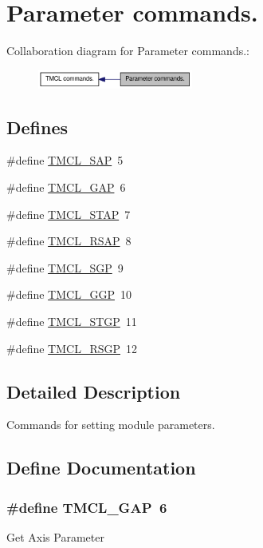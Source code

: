 \hypertarget{group__ParComm}{
\section{Parameter commands.}
\label{group__ParComm}
}


Collaboration diagram for Parameter commands.:\nopagebreak
\begin{figure}[H]
\begin{center}
\leavevmode
\includegraphics[width=145pt]{group__ParComm}
\end{center}
\end{figure}
\subsection*{Defines}
\begin{DoxyCompactItemize}
\item 
\#define \hyperlink{group__ParComm_ga9d041a48b17f51e16e6219d3cfe5a2ca}{TMCL\_\-SAP}~5
\item 
\#define \hyperlink{group__ParComm_gaeac28ca289b13b735506291521646a4a}{TMCL\_\-GAP}~6
\item 
\#define \hyperlink{group__ParComm_ga22d01b4d2941ab2a2881f17975424f41}{TMCL\_\-STAP}~7
\item 
\#define \hyperlink{group__ParComm_gab338e76ee77e5f122d1694c728beb5e3}{TMCL\_\-RSAP}~8
\item 
\#define \hyperlink{group__ParComm_ga12919729038b159bb1f9b275c9c8f5bc}{TMCL\_\-SGP}~9
\item 
\#define \hyperlink{group__ParComm_ga4bf884d087a29a85073718bbd0d4f928}{TMCL\_\-GGP}~10
\item 
\#define \hyperlink{group__ParComm_ga209b905332339e2b52a7166f46ef2db9}{TMCL\_\-STGP}~11
\item 
\#define \hyperlink{group__ParComm_ga21517120fb13310ef4416fd370fa91b6}{TMCL\_\-RSGP}~12
\end{DoxyCompactItemize}


\subsection{Detailed Description}
Commands for setting module parameters. 

\subsection{Define Documentation}
\hypertarget{group__ParComm_gaeac28ca289b13b735506291521646a4a}{
\subsubsection[{TMCL\_\-GAP}]{\setlength{\rightskip}{0pt plus 5cm}\#define TMCL\_\-GAP~6}}
\label{group__ParComm_gaeac28ca289b13b735506291521646a4a}
Get Axis Parameter 

